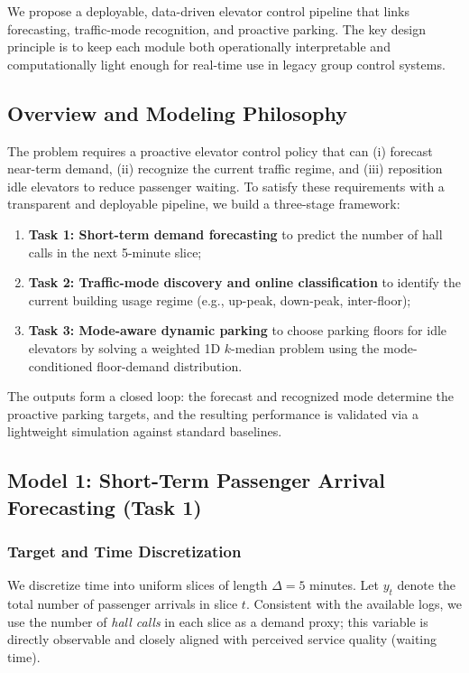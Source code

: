
We propose a deployable, data-driven elevator control pipeline that links forecasting, traffic-mode recognition, and proactive parking. The key design principle is to keep each module both operationally interpretable and computationally light enough for real-time use in legacy group control systems.


\subsection{Overview and Modeling Philosophy}

The problem requires a proactive elevator control policy that can (i) forecast near-term demand, (ii) recognize the current traffic regime, and (iii) reposition idle elevators to reduce passenger waiting. To satisfy these requirements with a transparent and deployable pipeline, we build a three-stage framework:
\begin{enumerate}[label = (\roman*)]
    \item \textbf{Task 1: Short-term demand forecasting} to predict the number of hall calls in the next 5-minute slice;
    \item \textbf{Task 2: Traffic-mode discovery and online classification} to identify the current building usage regime (e.g., up-peak, down-peak, inter-floor);
    \item \textbf{Task 3: Mode-aware dynamic parking} to choose parking floors for idle elevators by solving a weighted 1D $k$-median problem using the mode-conditioned floor-demand distribution.
\end{enumerate}
The outputs form a closed loop: the forecast and recognized mode determine the proactive parking targets, and the resulting performance is validated via a lightweight simulation against standard baselines.


\subsection{Model 1: Short-Term Passenger Arrival Forecasting (Task 1)}

\subsubsection{Target and Time Discretization}
We discretize time into uniform slices of length $\Delta=5$ minutes. Let $y_t$ denote the total number of passenger arrivals in slice $t$. Consistent with the available logs, we use the number of \emph{hall calls} in each slice as a demand proxy; this variable is directly observable and closely aligned with perceived service quality (waiting time).

